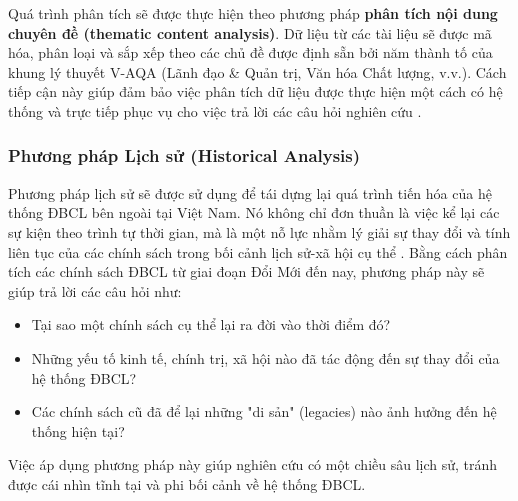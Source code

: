 \documentclass[12pt, a4paper, openany]{report}
\begin{document}
Quá trình phân tích sẽ được thực hiện theo phương pháp \textbf{phân tích nội dung chuyên đề (thematic content analysis)}. Dữ liệu từ các tài liệu sẽ được mã hóa, phân loại và sắp xếp theo các chủ đề được định sẵn bởi năm thành tố của khung lý thuyết V-AQA (Lãnh đạo \& Quản trị, Văn hóa Chất lượng, v.v.). Cách tiếp cận này giúp đảm bảo việc phân tích dữ liệu được thực hiện một cách có hệ thống và trực tiếp phục vụ cho việc trả lời các câu hỏi nghiên cứu \cite{BraunClarke2006}.

\subsubsection{Phương pháp Lịch sử (Historical Analysis)}
\label{subsubsec:phan_tich_lich_su}
Phương pháp lịch sử sẽ được sử dụng để tái dựng lại quá trình tiến hóa của hệ thống ĐBCL bên ngoài tại Việt Nam. Nó không chỉ đơn thuần là việc kể lại các sự kiện theo trình tự thời gian, mà là một nỗ lực nhằm lý giải sự thay đổi và tính liên tục của các chính sách trong bối cảnh lịch sử-xã hội cụ thể \cite{Tosh2015}. Bằng cách phân tích các chính sách ĐBCL từ giai đoạn Đổi Mới đến nay, phương pháp này sẽ giúp trả lời các câu hỏi như:
\begin{itemize}
    \item Tại sao một chính sách cụ thể lại ra đời vào thời điểm đó?
    \item Những yếu tố kinh tế, chính trị, xã hội nào đã tác động đến sự thay đổi của hệ thống ĐBCL?
    \item Các chính sách cũ đã để lại những "di sản" (legacies) nào ảnh hưởng đến hệ thống hiện tại?
\end{itemize}
Việc áp dụng phương pháp này giúp nghiên cứu có một chiều sâu lịch sử, tránh được cái nhìn tĩnh tại và phi bối cảnh về hệ thống ĐBCL.
\end{document}
